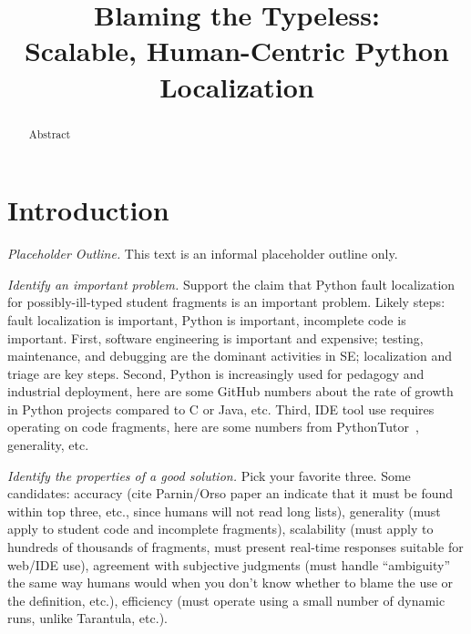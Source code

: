 \documentclass[conference]{IEEEtran}
\begin{document}
%
\title{Blaming the Typeless: \\ Scalable, Human-Centric Python Localization}

\iffalse

\author{\IEEEauthorblockN{Benjamin Cosman}
\IEEEauthorblockA{\textit{UC San Diego}\\
blcosman@eng.ecsd.edu}
\and
\IEEEauthorblockN{Leon Medvinsky}
\IEEEauthorblockA{\textit{UC San Diego}\\
lmedvinsky@eng.ecsd.edu}
\and
\IEEEauthorblockN{Ranjit Jhala}
\IEEEauthorblockA{\textit{UC San Diego}\\
jhala@cs.ecsd.edu}
\and
\IEEEauthorblockN{Westley Weimer}
\IEEEauthorblockA{\textit{University of Michigan}\\
weimerw@umich.edu}
}

\fi

\author{}

\maketitle

\begin{abstract}
Abstract
\end{abstract}

\section{Introduction}

\emph{Placeholder Outline.} This text is an informal placeholder outline
only.

\emph{Identify an important problem.} Support the claim that Python fault
localization for possibly-ill-typed student fragments is an important
problem. Likely steps: fault localization is important, Python is
important, incomplete code is important. First, software engineering is
important and expensive; testing, maintenance, and debugging are the
dominant activities in SE; localization and triage are key steps. Second,
Python is increasingly used for pedagogy and industrial deployment, here
are some GitHub numbers about the rate of growth in Python projects
compared to C or Java, etc. Third, IDE tool use requires operating on code
fragments, here are some numbers from PythonTutor~\cite{Guo2013-vu}, generality, etc.

\emph{Identify the properties of a good solution.} Pick your favorite
three. Some candidates: accuracy (cite Parnin/Orso paper an indicate that
it must be found within top three, etc., since humans will not read long
lists), generality (must apply to student code and incomplete fragments),
scalability (must apply to hundreds of thousands of fragments, must present
real-time responses suitable for web/IDE use), agreement with subjective
judgments (must handle ``ambiguity'' the same way humans would when you
don't know whether to blame the use or the definition, etc.), efficiency
(must operate using a small number of dynamic runs, unlike Tarantula,
etc.).
\end{document}
